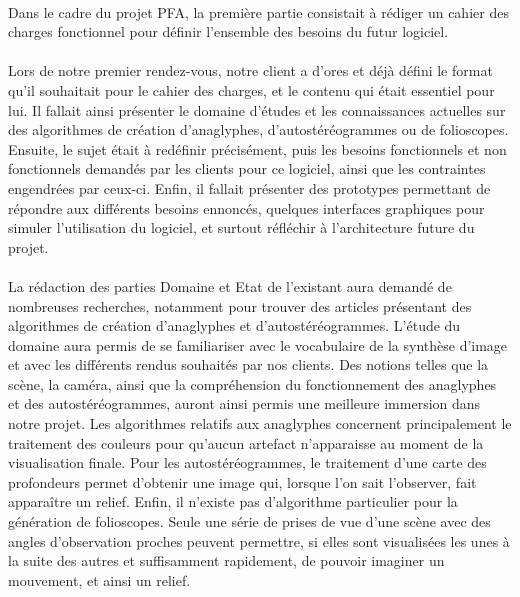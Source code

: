\paragraph{}
        Dans le cadre du projet PFA, la première partie consistait à rédiger un cahier des charges fonctionnel pour définir l'ensemble des besoins du futur logiciel.

\paragraph{}
        Lors de notre premier rendez-vous, notre client a d'ores et déjà défini le format qu'il souhaitait pour le cahier des charges, et le contenu qui était essentiel pour lui. Il fallait ainsi présenter le domaine d'études et les connaissances actuelles sur des algorithmes de création d'anaglyphes, d'autostéréogrammes ou de folioscopes. Ensuite, le sujet était à redéfinir précisément, puis les besoins fonctionnels et non fonctionnels demandés par les clients pour ce logiciel, ainsi que les contraintes engendrées par ceux-ci. Enfin, il fallait présenter des prototypes permettant de répondre aux différents besoins ennoncés, quelques interfaces graphiques pour simuler l'utilisation du logiciel, et surtout réfléchir à l'architecture future du projet.

\paragraph{}
        La rédaction des parties Domaine et Etat de l'existant aura demandé de nombreuses recherches, notamment pour trouver des articles présentant des algorithmes de création d'anaglyphes et d'autostéréogrammes. 
L'étude du domaine aura permis de se familiariser avec le vocabulaire de la synthèse d'image et avec les différents rendus souhaités par nos clients. Des notions telles que la scène, la caméra, ainsi que la compréhension du fonctionnement des anaglyphes et des autostéréogrammes, auront ainsi permis une meilleure immersion dans notre projet.
Les algorithmes relatifs aux anaglyphes concernent principalement le traitement des couleurs pour qu'aucun artefact n'apparaisse au moment de la visualisation finale. Pour les autostéréogrammes, le traitement d'une carte des profondeurs permet d'obtenir une image qui, lorsque l'on sait l'observer, fait apparaître un relief. Enfin, il n'existe pas d'algorithme particulier pour la génération de folioscopes. Seule une série de prises de vue d'une scène avec des angles d'observation proches peuvent permettre, si elles sont visualisées les unes à la suite des autres et suffisamment rapidement, de pouvoir imaginer un mouvement, et ainsi un relief.

